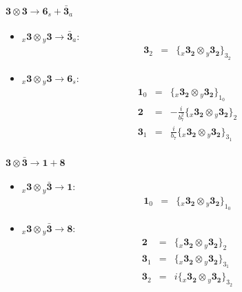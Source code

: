 \documentclass[english]{article}
\newcommand{\rep}[1]{\mathbf{#1}}
\newcommand{\repx}[2]{{}_{#2}\mathbf{#1}}
\newcommand{\subcg}[3]{\big\{ \repx{#1}{x}\otimes\repx{#2}{y}\big\}^{}_{#3}}
\begin{document}
\paragraph*{\Large $\rep{3}\otimes\rep{3}\to\rep{6}_s+\rep{\bar{3}}_a$}
\begin{itemize}
\item $\repx{3}{x}\otimes\repx{3}{y}\to\rep{\bar{3}}_{a}$:
\begin{eqnarray*}
\rep{3}_{2} &=& \subcg{3_{2}}{3_{2}}{3_{2}}
\end{eqnarray*}
\item $\repx{3}{x}\otimes\repx{3}{y}\to\rep{6}_{s}$:
\begin{eqnarray*}
\rep{1}_{0} &=& \subcg{3_{2}}{3_{2}}{1_{0}}
\\
\rep{2} &=& -\frac{i}{b_7^2}\subcg{3_{2}}{3_{2}}{2}
\\
\rep{3}_{1} &=& \frac{i}{b_7}\subcg{3_{2}}{3_{2}}{3_{1}}
\end{eqnarray*}
\end{itemize}
\paragraph*{\Large $\rep{3}\otimes\rep{\bar{3}}\to\rep{1}+\rep{8}$}
\begin{itemize}
\item $\repx{3}{x}\otimes\repx{\bar{3}}{y}\to\rep{1}$:
\begin{eqnarray*}
\rep{1}_{0} &=& \subcg{3_{2}}{3_{2}}{1_{0}}
\end{eqnarray*}
\item $\repx{3}{x}\otimes\repx{\bar{3}}{y}\to\rep{8}$:
\begin{eqnarray*}
\rep{2} &=& \subcg{3_{2}}{3_{2}}{2}
\\
\rep{3}_{1} &=& \subcg{3_{2}}{3_{2}}{3_{1}}
\\
\rep{3}_{2} &=& i\subcg{3_{2}}{3_{2}}{3_{2}}
\end{eqnarray*}
\end{itemize}
\end{document}
